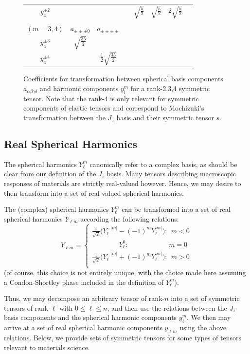 \documentclass[10pt,a4paper]{article}
\begin{document}
\begin{figure}
\begin{tabular}{c|ccccccc}
$y_4^{\pm 2}$ & & & & $\sqrt{\frac{5}{2}}$ & $\sqrt{\frac{5}{2}}$ & $2\sqrt{\frac{5}{2}}$  \\
\\
$(m=3,4)$& $a_{\pm\pm\pm 0}$ & $a_{\pm\pm\pm\pm}$  \\
$y_4^{\pm 3}$  & $\sqrt{\frac{35}{2}}$ &  \\
$y_4^{\pm 4}$  &  & $\frac{1}{2}\sqrt{\frac{35}{2}}$\\ 
\end{tabular}
\caption{Coefficients for transformation between spherical basis components $a_{\alpha\beta\gamma\delta}$ and harmonic components $y^m_l$ for a rank-2,3,4 symmetric tensor. Note that the rank-4 is only relevant for symmetric components of elastic tensors and correspond to Mochizuki's transformation \cite{mochizuki1988spherical} between the $J_z$ basis and their symmetric tensor $s$.}
\end{figure}
\subsection{Real Spherical Harmonics}
The spherical harmonics $Y_{\ell}^m$ canonically refer to a complex basis, as should be clear from our definition of the $J_z$ basis. Many tensors describing macroscopic responses of materials are strictly real-valued however. Hence, we may desire to then transform into a set of real-valued spherical harmonics.

The (complex) spherical harmonics $Y_{\ell}^m$ can be transformed into a set of real spherical harmonics $Y_{\ell m}$ according the following relations:
$$
Y_{\ell m }=
\begin{cases}
\frac{i}{\sqrt{2}}\big(Y_{\ell}^{-|m|} - (-1)^m Y_{\ell}^{|m|} \big):\ \ m<0\\
\quad\quad\quad\quad Y_{\ell}^0:\quad\quad\quad\quad\quad\ \ \  \ m=0\\
\frac{1}{\sqrt{2}}\big(Y_{\ell}^{-|m|} + (-1)^m Y_{\ell}^{|m|} \big):\ \ m>0\\
\end{cases}
$$
(of course, this choice is not entirely unique, with the choice made here assuming a Condon-Shortley phase included in the definition of $Y_{\ell}^m$).

Thus, we may decompose an arbitrary tensor of rank-$n$ into a set of symmetric tensors of rank-$\ell$ with $0\leq\ell\leq n$, and then use the relations between the $J_z$ basis components and the spherical harmonic components $y_{\ell}^m$. We then may arrive at a set of real spherical harmonic components $y_{\ell m}$ using the above relations. Below, we provide sets of symmetric tensors for some types of tensors relevant to materials science.
\end{document}
